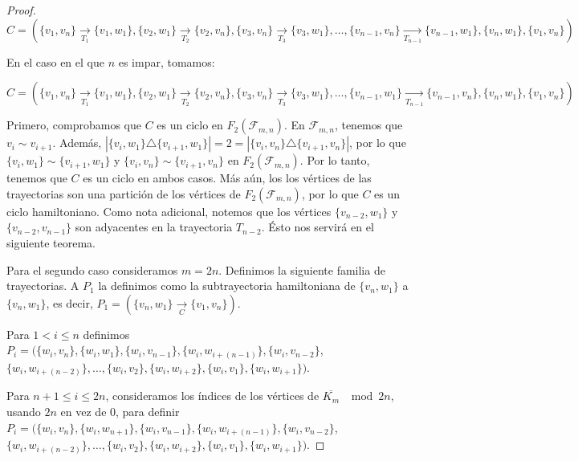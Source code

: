 \begin{proof}
    $C=(\{v_1,v_n\} \xrightarrow[T_1]{}\{v_1,w_1\},\{v_2,w_1\}
    \xrightarrow[T_2]{}\{v_2,v_n\},\{v_3,v_n\} \xrightarrow[T_3]{}\{v_3,w_1\},
    \dots, \{v_{n-1},v_n\}
    \xrightarrow[T_{n-1}]{}\{v_{n-1},w_1\},\{v_n,w_1\},\{v_1,v_n\})$

    En el caso en el que $n$ es impar, tomamos:

    $C=(\{v_1,v_n\} \xrightarrow[T_1]{}\{v_1,w_1\},\{v_2,w_1\}
    \xrightarrow[T_2]{}\{v_2,v_n\},\{v_3,v_n\} \xrightarrow[T_3]{}\{v_3,w_1\},
    \dots, \{v_{n-1},w_1\}
    \xrightarrow[T_{n-1}]{}\{v_{n-1},v_n\},\{v_n,w_1\},\{v_1,v_n\})$

    Primero, comprobamos que $C$ es un ciclo en $F_2(\mathcal{F}_{m,n})$. En
    $\mathcal{F}_{m,n}$, tenemos que $v_i \sim v_{i+1}$. Adem\'as,
    $|\{v_i,w_1\}\triangle \{v_{i+1},w_1\}|=2 =|\{v_i,v_n\}\triangle
    \{v_{i+1},v_n\}|$, por lo que $\{v_i,w_1\}\sim \{v_{i+1},w_1\}$ y
    $\{v_i,v_n\}\sim \{v_{i+1},v_n\}$ en $F_2(\mathcal{F}_{m,n})$. Por lo tanto,
    tenemos que $C$ es un ciclo en ambos casos. M\'as a\'un, los los v\'ertices
    de las trayectorias son una partici\'on de los v\'ertices de
    $F_2(\mathcal{F}_{m,n})$, por lo que $C$ es un ciclo hamiltoniano. Como nota
    adicional, notemos que los v\'ertices $\{v_{n-2},w_1\}$ y
    $\{v_{n-2},v_{n-1}\}$ son adyacentes en la trayectoria $T_{n-2}$. \'Esto nos
    servir\'a en el siguiente teorema.

    Para el segundo caso consideramos $m=2n$. Definimos la siguiente familia de
    trayectorias. A $P_1$ la definimos como la subtrayectoria hamiltoniana de
    $\{v_n,w_1\}$ a $\{v_n,w_1\}$, es decir, $P_1= (\{v_n,w_1\}
    \xrightarrow[C]{}\{v_1,v_n\})$. 
    
    Para $1 < i \leq n$ definimos
    $P_i=(\{w_i,v_n\},\{w_i,w_1\},\{w_i,v_{n-1}\},\{w_i,w_{i+(n-1)}\},\{w_i,v_{n-2}\}$,
    $\{w_i,w_{i+(n-2)}\},\dots,\{w_i,v_2\},\{w_i,w_{i+2}\},\{w_i,v_1\},\{w_i,w_{i+1}\})$.

    Para $n+1\leq i \leq 2n$, consideramos los \'indices de los v\'ertices de
    $\overline{K_m}$ $\mod 2n$, usando $2n$ en vez de $0$, para definir $P_i =
    (\{w_i,v_n\}, \{w_i,w_{n+1}\}, \{w_i,v_{n-1}\}, \{w_i,w_{i+(n-1)}\},
    \{w_i,v_{n-2}\}$, $\{w_i,w_{i+(n-2)}\}, \dots, \{w_i,v_2\}, \{w_i,w_{i+2}\},
    \{w_i,v_1\}, \{w_i,w_{i+1}\})$.


\end{proof}
